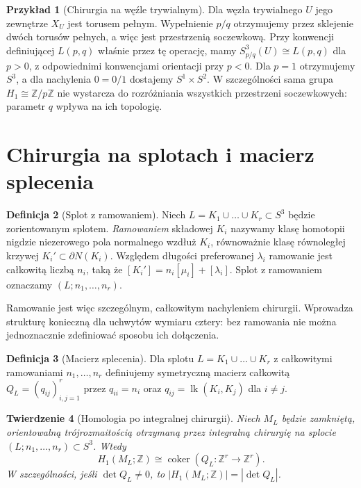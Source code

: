 \documentclass[11pt,a4paper]{report}
\numberwithin{equation}{section}
\theoremstyle{plain}
\newtheorem{twierdzenie}{Twierdzenie}[section]
\theoremstyle{definition}
\newtheorem{definicja}[twierdzenie]{Definicja}
\newtheorem{przyklad}[twierdzenie]{Przykład}
\theoremstyle{remark}
\begin{document}
\begin{przyklad}[Chirurgia na węźle trywialnym]
Dla węzła trywialnego $U$ jego zewnętrze $X_U$
jest torusem pełnym. Wypełnienie $p/q$ otrzymujemy
przez sklejenie dwóch torusów pełnych, a więc jest
przestrzenią soczewkową. Przy konwencji definiującej
$L(p,q)$ właśnie przez tę operację, mamy
$S^3_{p/q}(U)\cong L(p,q)$ dla $p>0$, z odpowiednimi
konwencjami orientacji przy $p<0$. Dla $p=1$ otrzymujemy
$S^3$, a dla nachylenia $0=0/1$ dostajemy $S^1\times S^2$.
W szczególności sama grupa $H_1\cong\mathbb Z/p\mathbb Z$
nie wystarcza do rozróżniania wszystkich przestrzeni
soczewkowych: parametr $q$ wpływa na ich topologię.
\end{przyklad}

\section{Chirurgia na splotach i macierz splecenia}
\label{sec:kt-chirurgia-link}

\begin{definicja}[Splot z ramowaniem]
Niech $L=K_1\cup\dots\cup K_r\subset S^3$ będzie
zorientowanym splotem. \emph{Ramowaniem} składowej $K_i$
nazywamy klasę homotopii nigdzie niezerowego pola normalnego
wzdłuż $K_i$, równoważnie klasę równoległej krzywej
$K_i'\subset\partial N(K_i)$. Względem długości preferowanej
$\lambda_i$ ramowanie jest całkowitą liczbą $n_i$, taką że
$[K_i']=n_i[\mu_i]+[\lambda_i]$.
Splot z ramowaniem oznaczamy $(L;n_1,\dots,n_r)$.
\end{definicja}

Ramowanie jest więc szczególnym, całkowitym nachyleniem
chirurgii. Wprowadza strukturę konieczną dla uchwytów
wymiaru cztery: bez ramowania nie można jednoznacznie
zdefiniować sposobu ich dołączenia.

\begin{definicja}[Macierz splecenia]
Dla splotu $L=K_1\cup\dots\cup K_r$ z całkowitymi
ramowaniami $n_1,\dots,n_r$ definiujemy symetryczną
macierz całkowitą $Q_L=(q_{ij})_{i,j=1}^r$ przez
$q_{ii}=n_i$ oraz $q_{ij}=\operatorname{lk}(K_i,K_j)$
dla $i\ne j$.
\end{definicja}

\begin{twierdzenie}[Homologia po integralnej chirurgii]
Niech $M_L$ będzie zamkniętą, orientowalną trójrozmaitością
otrzymaną przez integralną chirurgię na splocie
$(L;n_1,\ldots,n_r)\subset S^3$. Wtedy
\[
H_1(M_L;\mathbb Z)\cong\operatorname{coker}
(Q_L:\mathbb Z^r\longrightarrow\mathbb Z^r).
\]
W szczególności, jeśli $\det Q_L\ne0$, to
$|H_1(M_L;\mathbb Z)|=|\det Q_L|$.
\end{twierdzenie}
\end{document}
